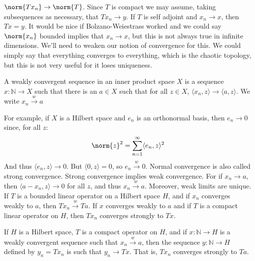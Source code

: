         $\norm{Tx_{n}}\rightarrow\norm{T}$. Since $T$ is
        compact we may assume, taking subsequences as
        necessary, that
        $Tx_{n}\rightarrow{y}$. If $T$ is self adjoint
        and $x_{n}\rightarrow{x}$, then
        $Tx=y$. It would be nice if Bolzano-Weiestrass worked
        and we could say
        $\norm{x_{n}}$ bounded implies that
        $x_{n}\rightarrow{x}$, but this is not always
        true in infinite dimensions. We'll need to
        weaken our notion of convergence for this. We
        could simply say that everything converges to
        everything, which is the chaotic topology, but
        this is not very useful for it loses uniqueness.
        \begin{definition}
            A weakly convergent sequence in an inner product
            space $X$ is a sequence
            $x:\mathbb{N}\rightarrow{X}$ such that there
            is an $a\in{X}$ such that
            for all $z\in{X}$,
            $\langle{x_{n},z}\rangle\rightarrow%
             \langle{a,z}\rangle$. We write
             $x_{n}\overset{w}{\rightarrow}{a}$
        \end{definition}
        For example, if $X$ is a Hilbert space and
        $e_{n}$ is an orthonormal basis, then
        $e_{n}\rightarrow{0}$ since, for all $z$:
        \begin{equation*}
            \norm{z}^{2}=\sum_{n=1}^{\infty}
            \langle{e_{n},z}\rangle^{2}
        \end{equation*}
        And thus $\langle{e_{n},z}\rangle\rightarrow{0}$.
        But $\langle{0,z}\rangle=0$, so
        $e_{n}\overset{w}{\rightarrow}{0}$. Normal convergence
        is also called strong convergence. Strong convergence
        implies weak convergence. For if
        $x_{n}\rightarrow{a}$, then
        $\langle{a-x_{n},z}\rangle\rightarrow{0}$ for all
        $z$, and thus $x_{n}\overset{w}{\rightarrow}{a}$.
        Moreover, weak limits are unique. If
        $T$ is a bounded linear operator on a Hilbert space
        $H$, and if $x_{n}$ converges weakly to $a$,
        then $Tx_{n}\overset{w}{\rightarrow}{Ta}$.
        If $x$ converges weakly to $a$ and if $T$ is a
        compact linear operator on $H$, then
        $Tx_{n}$ converges strongly to $Tx$.
        \begin{theorem}
            If $H$ is a Hilbert space,
            $T$ is a compact operator on $H$,
            and if $x:\mathbb{N}\rightarrow{H}$ is a
            weakly convergent sequence such that
            $x_{n}\overset{w}{\rightarrow}{a}$,
            then the sequence
            $y:\mathbb{N}\rightarrow{H}$ defined by
            $y_{n}=Tx_{n}$ is such that
            $y_{n}\rightarrow{Tx}$. That is,
            $Tx_{n}$ converges strongly to $Ta$.
        \end{theorem}
